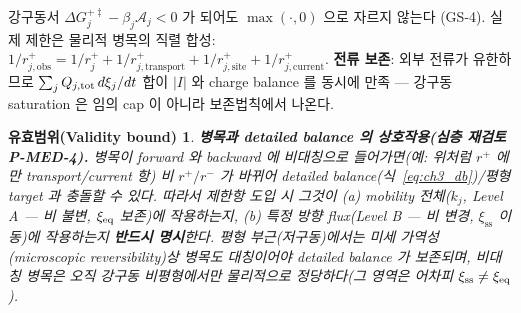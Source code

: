 \documentclass[11pt,a4paper]{article}
\newtheorem*{boundbox}{유효범위(Validity bound)}
\begin{document}
강구동서 $\Delta G_j^{+\ddagger}-\beta_j\mathcal A_j<0$ 가 되어도 $\max(\cdot,0)$ 으로 자르지 않는다
(GS-4). 실제 제한은 물리적 병목의 직렬 합성:
$1/r_{j,\mathrm{obs}}^+=1/r_j^++1/r_{j,\mathrm{transport}}^++1/r_{j,\mathrm{site}}^++1/r_{j,\mathrm{current}}^+$.
\textbf{전류 보존}: 외부 전류가 유한하므로 $\sum_j Q_{j,\mathrm{tot}}\,d\xi_j/dt$ 합이 $|I|$ 와 charge
balance 를 동시에 만족 — 강구동 saturation 은 임의 cap 이 아니라 보존법칙에서 나온다.
\begin{boundbox}
\textbf{병목과 detailed balance 의 상호작용(심층 재검토 P-MED-4).} 병목이 forward 와 backward 에
\emph{비대칭}으로 들어가면(예: 위처럼 $r^+$ 에만 transport/current 항) 비 $r^+/r^-$ 가 바뀌어
detailed balance(식~\eqref{eq:ch3_db})/평형 target 과 충돌할 수 있다. 따라서 제한항 도입 시 그것이
\emph{(a) mobility 전체}($k_j$, Level A — 비 불변, $\xi_{\mathrm{eq}}$ 보존)에 작용하는지, \emph{(b) 특정 방향
flux}(Level B — 비 변경, $\xi_{\mathrm{ss}}$ 이동)에 작용하는지 \textbf{반드시 명시}한다. 평형 부근(저구동)에서는
미세 가역성(microscopic reversibility)상 병목도 대칭이어야 detailed balance 가 보존되며, 비대칭 병목은
오직 \emph{강구동 비평형}에서만 물리적으로 정당하다(그 영역은 어차피 $\xi_{\mathrm{ss}}\ne\xi_{\mathrm{eq}}$).
\end{boundbox}
\end{document}
